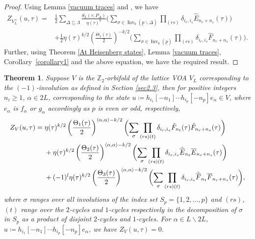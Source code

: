 \documentclass[pdftex]{sigma}
\numberwithin{equation}{section}
\newtheorem{Theorem}{Theorem}[section]
\theoremstyle{definition}
\begin{document}
\begin{proof}
 Using Lemma \ref{vacuum traces} and \cite[Theorem 22]{Mason20231-PointAlgebras}, we have
 \begin{align*}
 Z_{V_L^+}(u,\tau)={}&\frac{1}{2}\sum_{\Delta\subseteq \Lambda}\frac{\theta_L(\tau,P_{\Delta})}{\eta(\tau)^k}\bigg(\sum_{\sigma\in \operatorname{Inv}_0(\underline{p}\backslash \Delta)}\prod_{(rs)}\delta_{i_r,i_s}\hat{E}_{n_r+n_s}(\tau)\bigg)\\
 &+\frac{1}{2}\eta(\tau)^{k/2}\left(\frac{\Theta_1(\tau)}{2}\right)^{-k/2}\bigg(\sum_{\sigma\in \operatorname{Inv}_0(\underline{p})} \prod_{(rs)}\delta_{i_r,i_s}\hat{F}_{n_r+n_s}(\tau) \bigg).
 \end{align*}
 Further, using Theorem \ref{At Heisenberg states}, Lemma \ref{vacuum traces}, Corollary~\ref{corollary1} and the above equation, we have the required result.
\end{proof}

\begin{Theorem}
Suppose $V$ is the $\mathbb{Z}_2$-orbifold of the lattice VOA $V_L$ corresponding to the $(-1)$-involution as defined in Section {\rm\ref{sec2.3}}, then for positive integers $n_i\geq 1$, $\alpha\in 2L$, corresponding to the state
$u\coloneqq h_{i_1}[-n_1]\cdots h_{i_p}[-n_p]e_{\alpha}\in V$,
where $e_{\alpha}$ is $f_{\alpha}$ or $g_{\alpha}$ accordingly as $p$ is even or odd, respectively,
\begin{align*}
Z_V(u,\tau)={}&\eta(\tau)^{k/2}\left(\frac{\Theta_1(\tau)}{2}\right)^{\langle\alpha,\alpha\rangle-k/2}\biggl(\sum_{\sigma} \prod_{(rs)(t)}\delta_{i_r,i_s}\Tilde{F}_{n_t}(\tau)\hat{F}_{n_r+n_s}(\tau)\biggr)\\
&+\eta(\tau)^{k/2}\left(\frac{\Theta_2(\tau)}{2}\right)^{\langle\alpha,\alpha\rangle-k/2}
\biggl(\sum_{\sigma}\prod_{(rs)(t)}\delta_{i_r,i_s}\Tilde{\overline{E}}_{n_t}\overline{E}_{n_r+n_s}(\tau)\biggr)\\
&+(-1)^l\eta(\tau)^{k/2}\left(\frac{\Theta_3(\tau)}{2}\right)^{\langle\alpha,\alpha\rangle-k/2}\biggl(\sum_{\sigma}\prod_{(rs)(t)}\delta_{i_r,i_s}
\Tilde{\overline{F}}_{n_t}\overline{F}_{n_r+n_s}(\tau)\biggr),
\end{align*}
where $\sigma$ ranges over all involutions of the index set $S_p=\{1,2,\dots, p\}$ and $(rs)$, $(t)$ range over the $2$-cycles and $1$-cycles respectively in the decomposition of $\sigma$ in $S_p$ as a product of disjoint $2$-cycles and $1$-cycles. For $\alpha\in L\backslash 2L$,
$u\coloneqq h_{i_1}[-n_1]\cdots h_{i_p}[-n_p]e_{\alpha}$,
we have
$
Z_V(u,\tau)=0$.
\end{Theorem}
\end{document}
